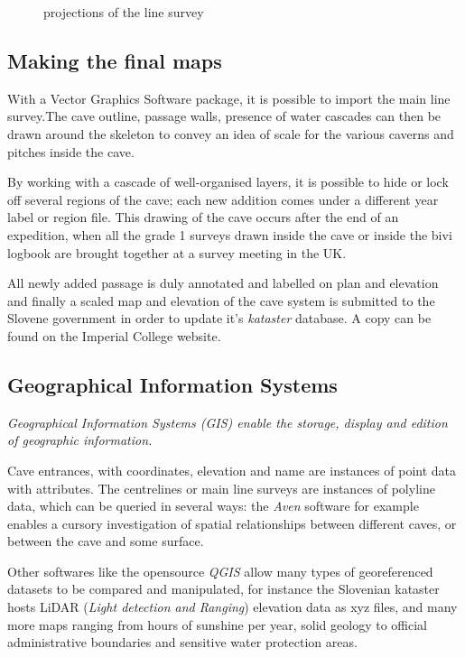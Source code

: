 \begin{figure*}[t!]
 \checkoddpage \ifoddpage \forcerectofloat \else \forceversofloat \fi
\centering
{}
\caption{projections of the line survey}
\label{projection}
\end{figure*}


\subsection{Making the final maps}
With a Vector Graphics Software package, it is possible to import the main line survey.The cave outline, passage walls, presence of water cascades can then be drawn around the skeleton to convey an idea of scale for the various caverns and pitches inside the cave.

By working with a cascade of well-organised layers, it is possible to hide or lock off several regions of the cave; each new addition comes under a different year label or region file. This drawing of the cave occurs after the end of an expedition, when all the grade 1 surveys drawn inside the cave or inside the bivi logbook are brought together at a survey meeting in the UK.

All newly added passage is duly annotated and labelled on plan and elevation and finally a scaled map and elevation of the cave system is submitted to the Slovene government in order to update it's \emph{kataster} database. A copy can be found on the Imperial College website.

\subsection{Geographical Information Systems}
\emph{Geographical Information Systems (GIS) enable the storage, display and edition of geographic information.} 

Cave entrances, with coordinates, elevation and name are instances of point data with attributes. The centrelines or main line surveys are instances of polyline data, which can be queried in several ways: the \emph{Aven} software for example enables a cursory investigation of spatial relationships between different caves, or between the cave and some surface.

Other softwares like the opensource \emph{QGIS} allow many types of georeferenced datasets to be compared and manipulated, for instance the Slovenian kataster hosts LiDAR (\emph{Light detection and Ranging}) elevation data as xyz files, and many more maps ranging from hours of sunshine per year, solid geology to official administrative boundaries and sensitive water protection areas. 

